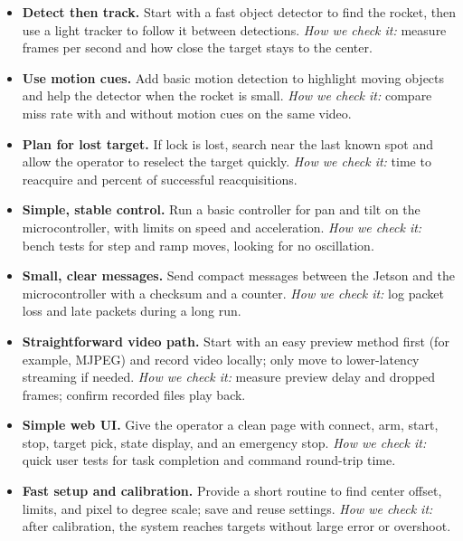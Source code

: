 \documentclass[12pt]{article}
\begin{document}
\begin{itemize}
  \item \textbf{Detect then track.}
        Start with a fast object detector to find the rocket, then use a light tracker to follow it between detections.
        \emph{How we check it:} measure frames per second and how close the target stays to the center.

  \item \textbf{Use motion cues.}
        Add basic motion detection to highlight moving objects and help the detector when the rocket is small.
        \emph{How we check it:} compare miss rate with and without motion cues on the same video.

  \item \textbf{Plan for lost target.}
        If lock is lost, search near the last known spot and allow the operator to reselect the target quickly.
        \emph{How we check it:} time to reacquire and percent of successful reacquisitions.

  \item \textbf{Simple, stable control.}
        Run a basic controller for pan and tilt on the microcontroller, with limits on speed and acceleration.
        \emph{How we check it:} bench tests for step and ramp moves, looking for no oscillation.

  \item \textbf{Small, clear messages.}
        Send compact messages between the Jetson and the microcontroller with a checksum and a counter.
        \emph{How we check it:} log packet loss and late packets during a long run.

  \item \textbf{Straightforward video path.}
        Start with an easy preview method first (for example, MJPEG) and record video locally; only move to lower-latency streaming if needed.
        \emph{How we check it:} measure preview delay and dropped frames; confirm recorded files play back.

  \item \textbf{Simple web UI.}
        Give the operator a clean page with connect, arm, start, stop, target pick, state display, and an emergency stop.
        \emph{How we check it:} quick user tests for task completion and command round-trip time.

  \item \textbf{Fast setup and calibration.}
        Provide a short routine to find center offset, limits, and pixel to degree scale; save and reuse settings.
        \emph{How we check it:} after calibration, the system reaches targets without large error or overshoot.


\end{itemize}
\end{document}
